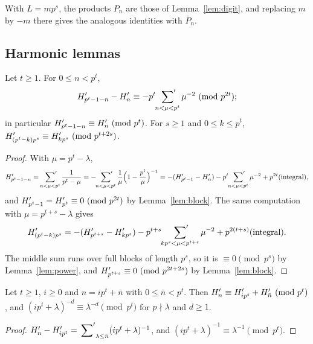 \documentclass[11pt]{amsart}
\begin{document}
With $L=mp^s$, the products $P_n$ are those of Lemma~\ref{lem:digit}, and replacing $m$ by $-m$ there gives the analogous identities with $\bar P_n$.

\subsection{Harmonic lemmas}

\begin{lemma}[reflection]\label{lem:refl}
Let $t\ge1$. For $0\le n<p^t$,
\[ H'_{p^t-1-n}-H'_n\equiv-p^t\sideset{}{'}\sum_{n<\mu<p^t}\mu^{-2}\ (\mathrm{mod}\ p^{2t}); \]
in particular $H'_{p^t-1-n}\equiv H'_n\ (\mathrm{mod}\ p^t)$. For $s\ge1$ and $0\le k\le p^t$, $H'_{(p^t-k)p^s}\equiv H'_{kp^s}\ (\mathrm{mod}\ p^{t+2s})$.
\end{lemma}
\begin{proof}
With $\mu=p^t-\lambda$,
\[ H'_{p^t-1-n}=\sideset{}{'}\sum_{n<\mu<p^t}\frac1{p^t-\mu}=-\sideset{}{'}\sum_{n<\mu<p^t}\frac1\mu\Bigl(1-\frac{p^t}\mu\Bigr)^{-1}=-(H'_{p^t-1}-H'_n)-p^t\sideset{}{'}\sum_{n<\mu<p^t}\mu^{-2}+p^{2t}(\text{integral}), \]
and $H'_{p^t-1}=H'_{p^t}\equiv0\ (\mathrm{mod}\ p^{2t})$ by Lemma~\ref{lem:block}. The same computation with $\mu=p^{t+s}-\lambda$ gives
\[ H'_{(p^t-k)p^s}=-(H'_{p^{t+s}}-H'_{kp^s})-p^{t+s}\sideset{}{'}\sum_{kp^s<\mu<p^{t+s}}\mu^{-2}+p^{2(t+s)}(\text{integral}). \]
The middle sum runs over full blocks of length $p^s$, so it is $\equiv0\pmod{p^s}$ by Lemma~\ref{lem:power}, and $H'_{p^{t+s}}\equiv0\ (\mathrm{mod}\ p^{2t+2s})$ by Lemma~\ref{lem:block}.
\end{proof}

\begin{lemma}\label{lem:shift}
Let $t\ge1$, $i\ge0$ and $n=ip^t+\bar n$ with $0\le\bar n<p^t$. Then $H'_n\equiv H'_{ip^t}+H'_{\bar n}\ (\mathrm{mod}\ p^t)$, and $(ip^t+\lambda)^{-d}\equiv\lambda^{-d}\pmod{p^t}$ for $p\nmid\lambda$ and $d\ge1$.
\end{lemma}
\begin{proof}
$H'_n-H'_{ip^t}=\sideset{}{'}\sum_{\lambda\le\bar n}(ip^t+\lambda)^{-1}$, and $(ip^t+\lambda)^{-1}\equiv\lambda^{-1}\pmod{p^t}$.
\end{proof}
\end{document}
